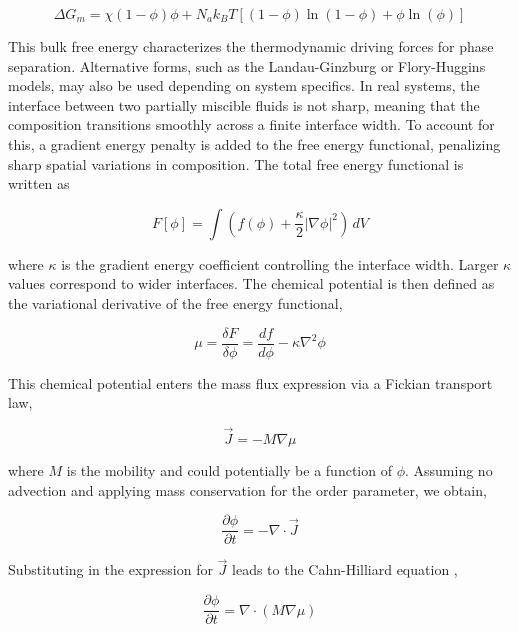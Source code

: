 \begin{equation}
    \Delta G_m = \chi (1 - \phi)\phi + N_a k_B T \left[(1 - \phi)\ln(1 - \phi) + \phi \ln(\phi)\right]
\end{equation}

This bulk free energy characterizes the thermodynamic driving forces for phase separation. Alternative forms, such as the Landau-Ginzburg or Flory-Huggins models, may also be used depending on system 
specifics. In real systems, the interface between two partially miscible fluids is not sharp, meaning that the composition transitions smoothly across a finite interface width. To account for this, a 
gradient energy penalty is added to the free energy functional, penalizing sharp spatial variations in composition. The total free energy functional is written as

\begin{equation}
    F[\phi] = \int \left( f(\phi) + \frac{\kappa}{2}|\nabla \phi|^2 \right) \, dV
\end{equation}

where $\kappa$ is the gradient energy coefficient controlling the interface width. Larger \(\kappa\) values correspond to wider interfaces.
The chemical potential is then defined as the variational derivative of the free energy functional,

\begin{equation}
    \mu = \frac{\delta F}{\delta \phi} = \frac{df}{d\phi} - \kappa \nabla^2 \phi
\end{equation}

This chemical potential enters the mass flux expression via a Fickian transport law,

\begin{equation}
    \vec{J} = -M \nabla \mu
\end{equation}

where $M$ is the mobility and could potentially be a function of $\phi$. Assuming no advection and applying mass conservation for the order parameter, we obtain,

\begin{equation}
    \frac{\partial \phi}{\partial t} = -\nabla \cdot \vec{J}
\end{equation}

Substituting in the expression for \(\vec{J}\) leads to the Cahn-Hilliard equation \cite{cahn_free_1958},

\begin{equation}
    \frac{\partial \phi}{\partial t} = \nabla \cdot \left( M \nabla \mu \right)
\end{equation}

